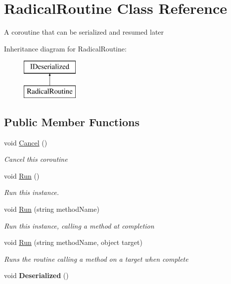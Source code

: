 \hypertarget{class_radical_routine}{}\section{Radical\+Routine Class Reference}
\label{class_radical_routine}


A coroutine that can be serialized and resumed later  


Inheritance diagram for Radical\+Routine\+:\begin{figure}[H]
\begin{center}
\leavevmode
\includegraphics[height=2.000000cm]{class_radical_routine}
\end{center}
\end{figure}
\subsection*{Public Member Functions}
\begin{DoxyCompactItemize}
\item 
void \hyperlink{class_radical_routine_ae628b04cef3d0780dcbef12be3d910a0}{Cancel} ()
\begin{DoxyCompactList}\small\item\em Cancel this coroutine \end{DoxyCompactList}\item 
void \hyperlink{class_radical_routine_a9449de246564f0d82a2890db45cbad94}{Run} ()
\begin{DoxyCompactList}\small\item\em Run this instance. \end{DoxyCompactList}\item 
void \hyperlink{class_radical_routine_a2e4e2003e922bb66ff5352b1fa33a6fa}{Run} (string method\+Name)
\begin{DoxyCompactList}\small\item\em Run this instance, calling a method at completion \end{DoxyCompactList}\item 
void \hyperlink{class_radical_routine_ab638af87a31b27630da41523771ea764}{Run} (string method\+Name, object target)
\begin{DoxyCompactList}\small\item\em Runs the routine calling a method on a target when complete \end{DoxyCompactList}\item 
\mbox{\label{class_radical_routine_a4e2d17f21fc9df7ef8bb06ba3a22e9e0}} 
void {\bfseries Deserialized} ()
\end{DoxyCompactItemize}
